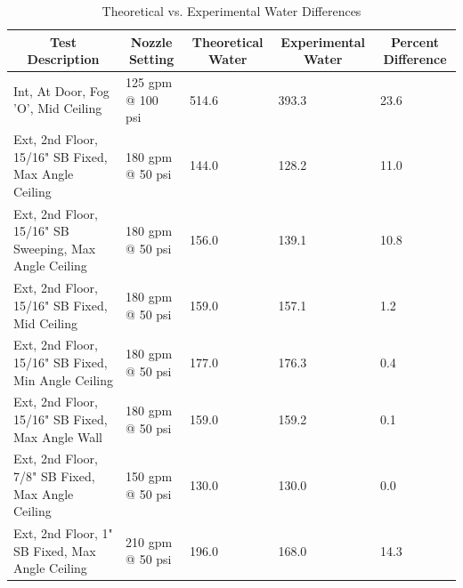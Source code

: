 \documentclass{book}
\begin{document}
\begin{table}[]
\tiny
\centering
\caption{Theoretical vs. Experimental Water Differences}
\label{Theoretical_vs._Experimental_Water_Differences}
\begin{tabular}{lllll}
\hline
\multicolumn{1}{|c|}{Test Description}                & \multicolumn{1}{c|}{Nozzle Setting} & \multicolumn{1}{c|}{Theoretical Water} & \multicolumn{1}{c|}{Experimental Water} & \multicolumn{1}{c|}{Percent Difference} \\ \hline
Int, At Door, Fog 'O', Mid Ceiling                    & 125 gpm @ 100 psi                   & 514.6                                  & 393.3                                   & 23.6                                    \\
Ext, 2nd Floor, 15/16" SB Fixed, Max Angle Ceiling    & 180 gpm @ 50 psi                    & 144.0                                  & 128.2                                   & 11.0                                    \\
Ext, 2nd Floor, 15/16" SB Sweeping, Max Angle Ceiling & 180 gpm @ 50 psi                    & 156.0                                  & 139.1                                   & 10.8                                    \\
Ext, 2nd Floor, 15/16" SB Fixed, Mid Ceiling          & 180 gpm @ 50 psi                    & 159.0                                  & 157.1                                   & 1.2                                     \\
Ext, 2nd Floor, 15/16" SB Fixed, Min Angle Ceiling    & 180 gpm @ 50 psi                    & 177.0                                  & 176.3                                   & 0.4                                     \\
Ext, 2nd Floor, 15/16" SB Fixed, Max Angle Wall       & 180 gpm @ 50 psi                    & 159.0                                  & 159.2                                   & 0.1                                     \\
Ext, 2nd Floor, 7/8" SB Fixed, Max Angle Ceiling      & 150 gpm @ 50 psi                    & 130.0                                  & 130.0                                   & 0.0                                     \\
Ext, 2nd Floor, 1" SB Fixed, Max Angle Ceiling        & 210 gpm @ 50 psi                    & 196.0                                  & 168.0                                   & 14.3                                    \\

\end{tabular}
\end{table}
\end{document}
